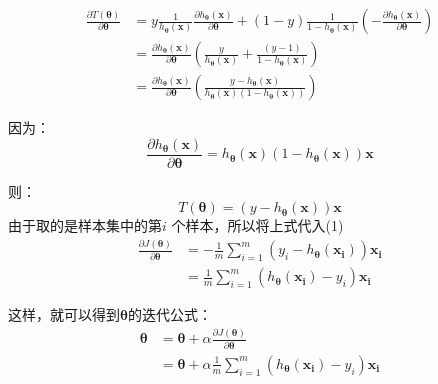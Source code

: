 \documentclass[a4paper,12pt]{book}
\begin{document}
    \begin{equation}
        \begin{aligned}
            \frac{\partial T(\boldsymbol{\theta})}{\partial \boldsymbol{\theta}} &= y\frac{1}{h_{\boldsymbol{\theta}}(\boldsymbol{x})}\frac{\partial h_{\boldsymbol{\theta}}(\boldsymbol{x})}{\partial \boldsymbol{\theta}}+(1-y)\frac{1}{1-h_{\boldsymbol{\theta}}(\boldsymbol{x})}(-\frac{\partial h_{\boldsymbol{\theta}}(\boldsymbol{x})}{\partial \boldsymbol{\theta}})\\
            &=\frac{\partial h_{\boldsymbol{\theta}}(\boldsymbol{x})}{\partial \boldsymbol{\theta}}(\frac{y}{h_{\boldsymbol{\theta}}(\boldsymbol{x})}+\frac{(y-1)}{1-h_{\boldsymbol{\theta}}(\boldsymbol{x})})\\
            &=\frac{\partial h_{\boldsymbol{\theta}}(\boldsymbol{x})}{\partial \boldsymbol{\theta}}(\frac{y-{h_{\boldsymbol{\theta}}(\boldsymbol{x})}}{{h_{\boldsymbol{\theta}}(\boldsymbol{x})}(1-{h_{\boldsymbol{\theta}}(\boldsymbol{x})})})
        \end{aligned}
    \end{equation}
 
    因为：
    $$
    \frac{\partial h_{\boldsymbol{\theta}}(\boldsymbol{x})}{\partial \boldsymbol{\theta}} = {h_{\boldsymbol{\theta}}(\boldsymbol{x})}(1-{h_{\boldsymbol{\theta}}(\boldsymbol{x})})\boldsymbol{x}
    $$

    则：
    $$
    T(\boldsymbol{\theta}) = (y-{h_{\boldsymbol{\theta}}(\boldsymbol{x})})\boldsymbol{x}
    $$
    由于取的是样本集中的第$i$ 个样本，所以将上式代入(1)
    \begin{equation}
        \begin{aligned}
            \frac{\partial J(\boldsymbol{\theta})}{\partial \boldsymbol{\theta}} &=  -\frac{1}{m}\sum_{i=1}^{m} (y_i-{h_{\boldsymbol{\theta}}(\boldsymbol{x_i})})\boldsymbol{x_i}\\
            &=\frac{1}{m}\sum_{i=1}^{m} ({h_{\boldsymbol{\theta}}(\boldsymbol{x_i})}-y_i)\boldsymbol{x_i}
        \end{aligned}
    \end{equation}
    
    这样，就可以得到$\boldsymbol{\theta}$的迭代公式：
    \begin{equation}
        \begin{aligned}
            \boldsymbol{\theta} &= \boldsymbol{\theta} + \alpha\frac{\partial J(\boldsymbol{\theta})}{\partial \boldsymbol{\theta}} \\
            &=\boldsymbol{\theta} + \alpha\frac{1}{m}\sum_{i=1}^{m} ({h_{\boldsymbol{\theta}}(\boldsymbol{x_i})}-y_i)\boldsymbol{x_i}
    \end{aligned}
    \end{equation}
   
\end{document}

